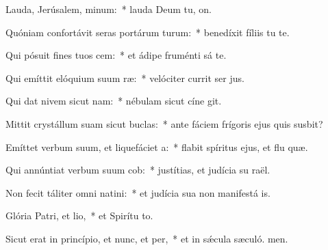 \item Lauda, Jerúsalem, minum:~* lauda Deum tu, on.
\item Quóniam confortávit seras portárum turum:~* benedíxit fíliis tu  te.
\item Qui pósuit fines tuos cem:~* et ádipe fruménti sá te.
\item Qui emíttit elóquium suum ræ:~* velóciter currit ser jus.
\item Qui dat nivem sicut nam:~* nébulam sicut cíne git.
\item Mittit crystállum suam sicut buclas:~* ante fáciem frígoris ejus quis susbit?
\item Emíttet verbum suum, et liquefáciet a:~* flabit spíritus ejus, et flu quæ.
\item Qui annúntiat verbum suum cob:~* justítias, et judícia su raël.
\item Non fecit táliter omni natini:~* et judícia sua non manifestá is.
\item Glória Patri, et lio,~* et Spirítu to.
\item Sicut erat in princípio, et nunc, et per,~* et in sǽcula sæculó. men.
